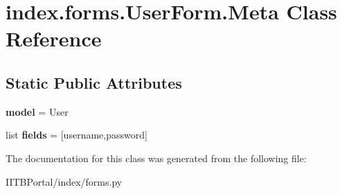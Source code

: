 \hypertarget{classindex_1_1forms_1_1UserForm_1_1Meta}{}\section{index.\+forms.\+User\+Form.\+Meta Class Reference}
\label{classindex_1_1forms_1_1UserForm_1_1Meta}
\subsection*{Static Public Attributes}
\begin{DoxyCompactItemize}
\item 
\mbox{\label{classindex_1_1forms_1_1UserForm_1_1Meta_a24dd8b9ba3f4186eae945f5de6297f31}} 
{\bfseries model} = User
\item 
\mbox{\label{classindex_1_1forms_1_1UserForm_1_1Meta_abd1f42ff208c2b9fc34da6a720a3f9c9}} 
list {\bfseries fields} = \mbox{[}\textquotesingle{}username\textquotesingle{},\textquotesingle{}password\textquotesingle{}\mbox{]}
\end{DoxyCompactItemize}


The documentation for this class was generated from the following file\+:\begin{DoxyCompactItemize}
\item 
I\+I\+T\+B\+Portal/index/forms.\+py\end{DoxyCompactItemize}
